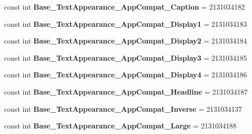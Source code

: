 \begin{DoxyCompactItemize}
\item 
\hypertarget{classClient_1_1Droid_1_1Resource_1_1Style_a33fdfd7a28398f81adf7ee4e9e6bd44f}{}const int {\bfseries Base\+\_\+\+Text\+Appearance\+\_\+\+App\+Compat\+\_\+\+Caption} = 2131034182\label{classClient_1_1Droid_1_1Resource_1_1Style_a33fdfd7a28398f81adf7ee4e9e6bd44f}

\item 
\hypertarget{classClient_1_1Droid_1_1Resource_1_1Style_a1e4f5c44238494637bd2ed63ac4f13a9}{}const int {\bfseries Base\+\_\+\+Text\+Appearance\+\_\+\+App\+Compat\+\_\+\+Display1} = 2131034183\label{classClient_1_1Droid_1_1Resource_1_1Style_a1e4f5c44238494637bd2ed63ac4f13a9}

\item 
\hypertarget{classClient_1_1Droid_1_1Resource_1_1Style_a0381b4d2e88ce95a2d99bba270984b60}{}const int {\bfseries Base\+\_\+\+Text\+Appearance\+\_\+\+App\+Compat\+\_\+\+Display2} = 2131034184\label{classClient_1_1Droid_1_1Resource_1_1Style_a0381b4d2e88ce95a2d99bba270984b60}

\item 
\hypertarget{classClient_1_1Droid_1_1Resource_1_1Style_a70d3cfda6d9b4f4edccf39885060d607}{}const int {\bfseries Base\+\_\+\+Text\+Appearance\+\_\+\+App\+Compat\+\_\+\+Display3} = 2131034185\label{classClient_1_1Droid_1_1Resource_1_1Style_a70d3cfda6d9b4f4edccf39885060d607}

\item 
\hypertarget{classClient_1_1Droid_1_1Resource_1_1Style_aad0ab3f9bce8700a5d30e05d804a10a6}{}const int {\bfseries Base\+\_\+\+Text\+Appearance\+\_\+\+App\+Compat\+\_\+\+Display4} = 2131034186\label{classClient_1_1Droid_1_1Resource_1_1Style_aad0ab3f9bce8700a5d30e05d804a10a6}

\item 
\hypertarget{classClient_1_1Droid_1_1Resource_1_1Style_ae182ddc484b5e75f5ad3842baebbbcee}{}const int {\bfseries Base\+\_\+\+Text\+Appearance\+\_\+\+App\+Compat\+\_\+\+Headline} = 2131034187\label{classClient_1_1Droid_1_1Resource_1_1Style_ae182ddc484b5e75f5ad3842baebbbcee}

\item 
\hypertarget{classClient_1_1Droid_1_1Resource_1_1Style_ad16447179138354bd2a36688042aaf6a}{}const int {\bfseries Base\+\_\+\+Text\+Appearance\+\_\+\+App\+Compat\+\_\+\+Inverse} = 2131034137\label{classClient_1_1Droid_1_1Resource_1_1Style_ad16447179138354bd2a36688042aaf6a}

\item 
\hypertarget{classClient_1_1Droid_1_1Resource_1_1Style_afcef515847cf347b9339c838281feafd}{}const int {\bfseries Base\+\_\+\+Text\+Appearance\+\_\+\+App\+Compat\+\_\+\+Large} = 2131034188\label{classClient_1_1Droid_1_1Resource_1_1Style_afcef515847cf347b9339c838281feafd}


\end{DoxyCompactItemize}
